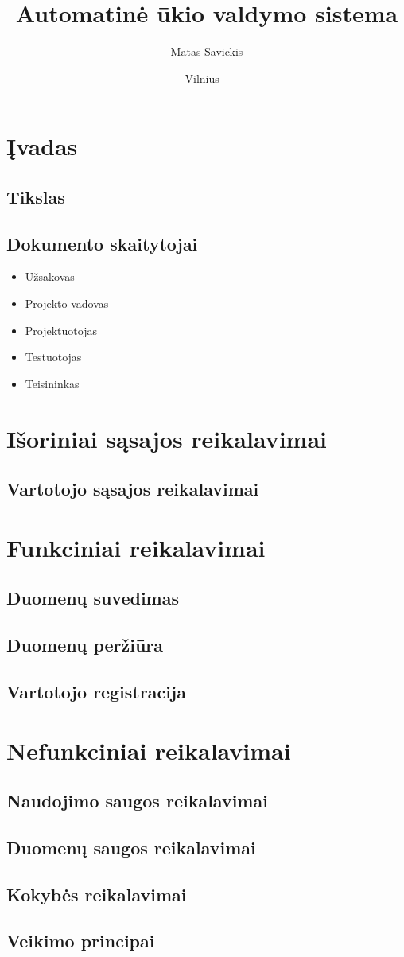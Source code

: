 \documentclass[oneside]{VUMIFPSkursinis}
\title{Automatinė ūkio valdymo sistema}
\author{Matas Savickis}
\date{Vilnius – \the\year}
\begin{document}
\maketitle

\tableofcontents
\centering

\section{Įvadas}
\subsection{Tikslas}
\subsection{Dokumento skaitytojai}
\begin{itemize}
	\item Užsakovas
	\item Projekto vadovas
	\item Projektuotojas
	\item Testuotojas
	\item Teisininkas
\end{itemize}

\section{Išoriniai sąsajos reikalavimai}
\subsection{Vartotojo sąsajos reikalavimai}

\section{Funkciniai reikalavimai}
\subsection{Duomenų suvedimas}
\subsection{Duomenų peržiūra}
\subsection{Vartotojo registracija}



\section{Nefunkciniai reikalavimai}
\subsection{Naudojimo saugos reikalavimai}
\subsection{Duomenų saugos reikalavimai}
\subsection{Kokybės reikalavimai}
\subsection{Veikimo principai}
\end{document}
